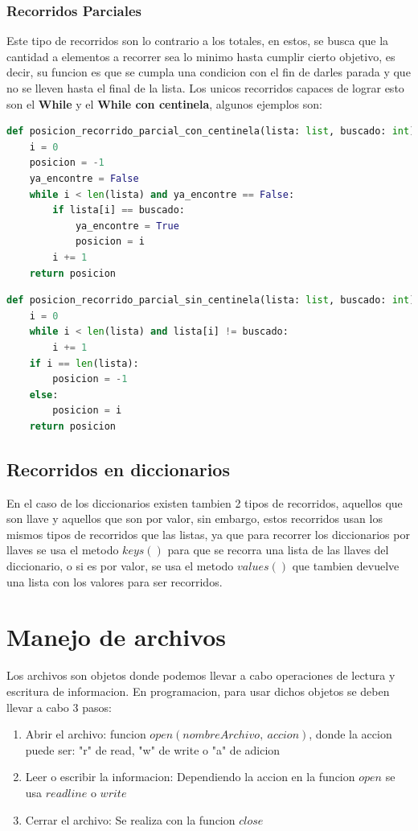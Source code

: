 \documentclass{article}
\begin{document}
\subsubsection{Recorridos Parciales}
Este tipo de recorridos son lo contrario a los totales, en estos, se busca que la cantidad a elementos a recorrer sea lo minimo hasta cumplir cierto objetivo, es decir, su funcion es que se cumpla una condicion con el fin de darles parada y que no se lleven hasta el final de la lista. Los unicos recorridos capaces de lograr esto son el \textbf{While} y el \textbf{While con centinela}, algunos ejemplos son:
\begin{lstlisting}[language=Python, caption= While con centinela]
def posicion_recorrido_parcial_con_centinela(lista: list, buscado: int) -> int:
    i = 0
    posicion = -1
    ya_encontre = False
    while i < len(lista) and ya_encontre == False:
        if lista[i] == buscado:
            ya_encontre = True
            posicion = i
        i += 1
    return posicion
\end{lstlisting}
\begin{lstlisting}[language=Python, caption= While sin centinela]
def posicion_recorrido_parcial_sin_centinela(lista: list, buscado: int) -> int:
    i = 0
    while i < len(lista) and lista[i] != buscado:
        i += 1
    if i == len(lista):
        posicion = -1
    else:
        posicion = i
    return posicion
\end{lstlisting}
\subsection{Recorridos en diccionarios}
En el caso de los diccionarios existen tambien 2 tipos de recorridos, aquellos que son llave y aquellos que son por valor, sin embargo, estos recorridos usan los mismos tipos de recorridos que las listas, ya que para recorrer los diccionarios por llaves se usa el metodo \(keys()\) para que se recorra una lista de las llaves del diccionario, o si es por valor, se usa el metodo \(values()\) que tambien devuelve una lista con los valores para ser recorridos.
\section{Manejo de archivos}
Los archivos son objetos donde podemos llevar a cabo operaciones de lectura y escritura de informacion. En programacion, para usar dichos objetos se deben llevar a cabo 3 pasos:
\begin{enumerate}
    \item Abrir el archivo: funcion \(open(nombreArchivo, \ accion)\), donde la accion puede ser: "r" de read, "w" de write o "a" de adicion
    \item Leer o escribir la informacion: Dependiendo la accion en la funcion \(open\) se usa \(readline\) o \(write\)
    \item Cerrar el archivo: Se realiza con la funcion \(close\)
\end{enumerate}
\end{document}
